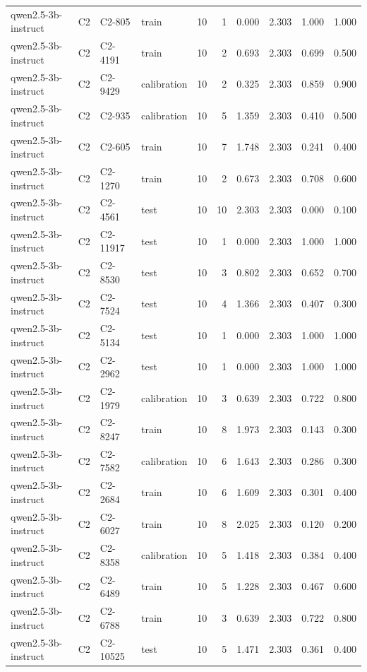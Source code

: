 \begin{table}
\begin{tabular}{llllrrrrrr}
qwen2.5-3b-instruct & C2 & C2-805 & train & 10 & 1 & 0.000 & 2.303 & 1.000 & 1.000 \\
qwen2.5-3b-instruct & C2 & C2-4191 & train & 10 & 2 & 0.693 & 2.303 & 0.699 & 0.500 \\
qwen2.5-3b-instruct & C2 & C2-9429 & calibration & 10 & 2 & 0.325 & 2.303 & 0.859 & 0.900 \\
qwen2.5-3b-instruct & C2 & C2-935 & calibration & 10 & 5 & 1.359 & 2.303 & 0.410 & 0.500 \\
qwen2.5-3b-instruct & C2 & C2-605 & train & 10 & 7 & 1.748 & 2.303 & 0.241 & 0.400 \\
qwen2.5-3b-instruct & C2 & C2-1270 & train & 10 & 2 & 0.673 & 2.303 & 0.708 & 0.600 \\
qwen2.5-3b-instruct & C2 & C2-4561 & test & 10 & 10 & 2.303 & 2.303 & 0.000 & 0.100 \\
qwen2.5-3b-instruct & C2 & C2-11917 & test & 10 & 1 & 0.000 & 2.303 & 1.000 & 1.000 \\
qwen2.5-3b-instruct & C2 & C2-8530 & test & 10 & 3 & 0.802 & 2.303 & 0.652 & 0.700 \\
qwen2.5-3b-instruct & C2 & C2-7524 & test & 10 & 4 & 1.366 & 2.303 & 0.407 & 0.300 \\
qwen2.5-3b-instruct & C2 & C2-5134 & test & 10 & 1 & 0.000 & 2.303 & 1.000 & 1.000 \\
qwen2.5-3b-instruct & C2 & C2-2962 & test & 10 & 1 & 0.000 & 2.303 & 1.000 & 1.000 \\
qwen2.5-3b-instruct & C2 & C2-1979 & calibration & 10 & 3 & 0.639 & 2.303 & 0.722 & 0.800 \\
qwen2.5-3b-instruct & C2 & C2-8247 & train & 10 & 8 & 1.973 & 2.303 & 0.143 & 0.300 \\
qwen2.5-3b-instruct & C2 & C2-7582 & calibration & 10 & 6 & 1.643 & 2.303 & 0.286 & 0.300 \\
qwen2.5-3b-instruct & C2 & C2-2684 & train & 10 & 6 & 1.609 & 2.303 & 0.301 & 0.400 \\
qwen2.5-3b-instruct & C2 & C2-6027 & train & 10 & 8 & 2.025 & 2.303 & 0.120 & 0.200 \\
qwen2.5-3b-instruct & C2 & C2-8358 & calibration & 10 & 5 & 1.418 & 2.303 & 0.384 & 0.400 \\
qwen2.5-3b-instruct & C2 & C2-6489 & train & 10 & 5 & 1.228 & 2.303 & 0.467 & 0.600 \\
qwen2.5-3b-instruct & C2 & C2-6788 & train & 10 & 3 & 0.639 & 2.303 & 0.722 & 0.800 \\
qwen2.5-3b-instruct & C2 & C2-10525 & test & 10 & 5 & 1.471 & 2.303 & 0.361 & 0.400 \\

\end{tabular}
\end{table}

